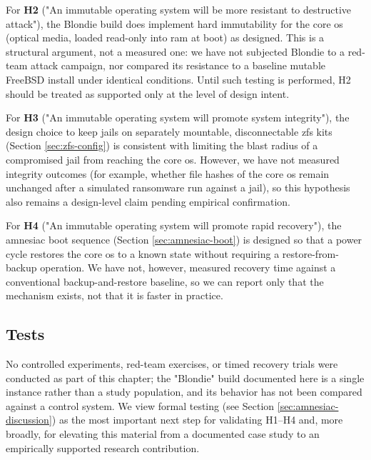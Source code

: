 For \textbf{H2} ("An immutable \gls{operating system} will be more resistant to destructive \gls{attack}"), the Blondie build does implement \gls{hard immutability} for the core \gls{os} (optical media, loaded read-only into \gls{ram} at boot) as designed.  This is a structural argument, not a measured one: we have not subjected Blondie to a red-team \gls{attack} campaign, nor compared its resistance to a baseline mutable FreeBSD install under identical conditions.  Until such testing is performed, H2 should be treated as supported only at the level of design intent.

For \textbf{H3} ("An immutable \gls{operating system} will promote system \gls{integrity}"), the design choice to keep \glspl{jail} on separately mountable, disconnectable \gls{zfs} kits (Section \ref{sec:zfs-config}) is consistent with limiting the blast radius of a compromised \gls{jail} from reaching the core \gls{os}.  However, we have not measured \gls{integrity} outcomes (for example, whether file hashes of the core \gls{os} remain unchanged after a simulated \gls{ransomware} run against a \gls{jail}), so this hypothesis also remains a design-level claim pending empirical confirmation.

For \textbf{H4} ("An immutable \gls{operating system} will promote rapid recovery"), the amnesiac boot sequence (Section \ref{sec:amnesiac-boot}) is designed so that a power cycle restores the core \gls{os} to a known state without requiring a restore-from-\gls{backup} operation.  We have not, however, measured recovery time against a conventional \gls{backup}-and-restore baseline, so we can report only that the mechanism exists, not that it is faster in practice.

\subsection{Tests}
No controlled experiments, red-team exercises, or timed recovery trials were conducted as part of this chapter; the "Blondie" build documented here is a single instance rather than a study population, and its behavior has not been compared against a control system.  We view formal testing (see Section \ref{sec:amnesiac-discussion}) as the most important next step for validating H1--H4 and, more broadly, for elevating this material from a documented case study to an empirically supported research contribution.

